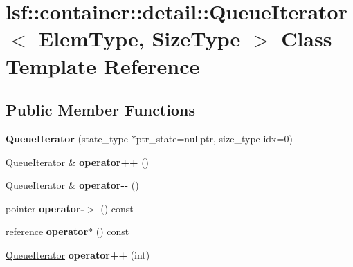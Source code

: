 \hypertarget{classlsf_1_1container_1_1detail_1_1QueueIterator}{
\section{lsf::container::detail::QueueIterator$<$ ElemType, SizeType $>$ Class Template Reference}
\label{classlsf_1_1container_1_1detail_1_1QueueIterator}
}
\subsection*{Public Member Functions}
\begin{DoxyCompactItemize}
\item 
\hypertarget{classlsf_1_1container_1_1detail_1_1QueueIterator_aa03bd14203a4ce7622429a08bec9a287}{
{\bfseries QueueIterator} (state\_\-type $\ast$ptr\_\-state=nullptr, size\_\-type idx=0)}
\label{classlsf_1_1container_1_1detail_1_1QueueIterator_aa03bd14203a4ce7622429a08bec9a287}

\item 
\hypertarget{classlsf_1_1container_1_1detail_1_1QueueIterator_a05484b2c8e4fa8cb8780d687a4a61f64}{
\hyperlink{classlsf_1_1container_1_1detail_1_1QueueIterator}{QueueIterator} \& {\bfseries operator++} ()}
\label{classlsf_1_1container_1_1detail_1_1QueueIterator_a05484b2c8e4fa8cb8780d687a4a61f64}

\item 
\hypertarget{classlsf_1_1container_1_1detail_1_1QueueIterator_aed0ca376cbe30640bcd8ddcdf2b38746}{
\hyperlink{classlsf_1_1container_1_1detail_1_1QueueIterator}{QueueIterator} \& {\bfseries operator-\/-\/} ()}
\label{classlsf_1_1container_1_1detail_1_1QueueIterator_aed0ca376cbe30640bcd8ddcdf2b38746}

\item 
\hypertarget{classlsf_1_1container_1_1detail_1_1QueueIterator_a52eed5a49d96f623e01b4467dc8d9962}{
pointer {\bfseries operator-\/$>$} () const }
\label{classlsf_1_1container_1_1detail_1_1QueueIterator_a52eed5a49d96f623e01b4467dc8d9962}

\item 
\hypertarget{classlsf_1_1container_1_1detail_1_1QueueIterator_a3662abbcb64b8adc34397c09c643d71d}{
reference {\bfseries operator$\ast$} () const }
\label{classlsf_1_1container_1_1detail_1_1QueueIterator_a3662abbcb64b8adc34397c09c643d71d}

\item 
\hypertarget{classlsf_1_1container_1_1detail_1_1QueueIterator_aa5c007587a2a8def5918de9a48d36f76}{
\hyperlink{classlsf_1_1container_1_1detail_1_1QueueIterator}{QueueIterator} {\bfseries operator++} (int)}
\label{classlsf_1_1container_1_1detail_1_1QueueIterator_aa5c007587a2a8def5918de9a48d36f76}


\end{DoxyCompactItemize}
